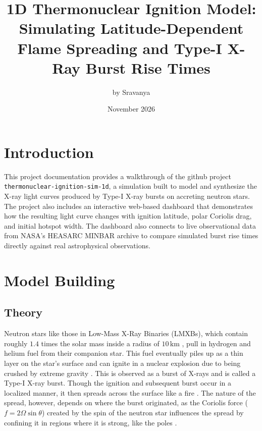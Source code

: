 \documentclass[11pt,a4paper]{article}
\title{\textbf{1D Thermonuclear Ignition Model: Simulating Latitude-Dependent Flame Spreading and Type-I X-Ray Burst Rise Times}}
\author{by Sravanya}
\date{November 2026}
\begin{document}
\maketitle

\section{Introduction}

This project documentation provides a walkthrough of the github project \texttt{thermonuclear-ignition-sim-1d}, a simulation built to model and synthesize the X-ray light curves produced by Type-I X-ray bursts on accreting neutron stars. The project also includes an interactive web-based dashboard that demonstrates how the resulting light curve changes with ignition latitude, polar Coriolis drag, and initial hotspot width. The dashboard also connects to live observational data from NASA's HEASARC MINBAR archive \citep{Galloway2020,HEASARC_TAP} to compare simulated burst rise times directly against real astrophysical observations.

\section{Model Building}

\subsection{Theory}
Neutron stars like those in Low-Mass X-Ray Binaries (LMXBs), which contain roughly $1.4$ times the solar mass inside a radius of $10\,\mathrm{km}$ \citep{Lattimer2004}, pull in hydrogen and helium fuel from their companion star. This fuel eventually piles up as a thin layer on the star's surface and can ignite in a nuclear explosion due to being crushed by extreme gravity \citep{Bildsten1998}. This is observed as a burst of X-rays and is called a Type-I X-ray burst. Though the ignition and subsequent burst occur in a localized manner, it then spreads across the surface like a fire \citep{Cumming2000}. The nature of the spread, however, depends on where the burst originated, as the Coriolis force ($f = 2\Omega\sin\theta$) created by the spin of the neutron star influences the spread by confining it in regions where it is strong, like the poles \citep{Spitkovsky2002,Bult2022}.
\end{document}
